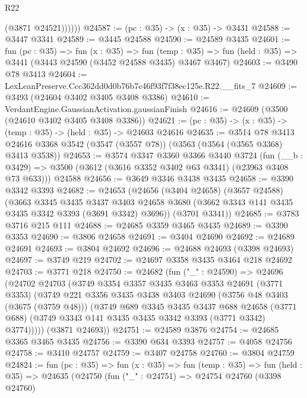 \begin{lexlean}{R22}
\begin{coremodule}
              (@3871 @24521))))))
@24587 := (pc : @35) -> (x : @35) -> @3431
@24588 := @3447 @3341
@24589 := @3445 @24588
@24590 := @24589 @3435
@24601 := fun (pc : @35) =>
  fun (x : @35) =>
  fun (temp : @35) => fun (held : @35) => @3441 (@3443 @24590 (@3452 @24588 @3435) @3467 @3467)
@24603 := @3490 @78 @3413
@24604 := LexLeanPreserve.Ccc362dd0d0b76b7c46f93f7f38ec125e.R22.__fits_7
@24609 := @3493 (@24604 @3402 @3405 @3408 @3386)
@24610 := VerdantEngine.GaussianActivation.gaussianFinish
@24616 := @24609 (@3500 (@24610 @3402 @3405 @3408 @3386))
@24621 := (pc : @35) -> (x : @35) -> (temp : @35) -> (held : @35) -> @24603 @24616
@24635 := @3514
    @78
    @3413
    @24616
    @3368
    @3542
    (@3547 (@3557 @78))
    (@3563 (@3564 (@3565 @3368) @3413 @3538))
@24653 := @3574
    @3347
    @3360
    @3366
    @3440
    @3724
    (fun (__b : @3429) => @3500 (@3612 (@3616 @3352 @3402 @63 @3341) (@23963 @3408 @73 @633)))
    @24588
@24656 := @3649 @3346 @3438 @3435
@24658 := @3390 @3342 @3393
@24682 := @24653
    (@24656
      (@3404 @24658)
      (@3657 @24588)
      (@3663
        @3345
        @3435
        @3437
        @3403
        @24658
        @3680
        (@3662 @3343 @141 @3435 @3435 @3342 @3393 (@3691 @3342) @3696))
      (@3701 @3341))
@24685 := @3783 @3716 @215 @111
@24688 := @24685 @3359 @3465 @3435
@24689 := @3390 @3353
@24690 := @3806 @24658
@24691 := @3404 @24690
@24692 := @24689 @24691
@24693 := @3804 @24692
@24696 := @24688 @24693 (@3398 @24693)
@24697 := @3749 @219
@24702 := @24697 @3358 @3435 @3464 @218 @24692
@24703 := @3771 @218
@24750 := @24682
    (fun ("_" : @24590) =>
    @24696
      (@24702
        @24703
        (@3749
          @3354
          @3357
          @3435
          @3463
          @3353
          @24691
          (@3771 @3353)
          (@3749
            @221
            @3356
            @3435
            @3438
            @3403
            @24690
            (@3756 @48 @3403 (@3675 (@3759 @48)))
            (@3749
              @689
              @3345
              @3435
              @3437
              @688
              @24658
              (@3771 @688)
              (@3749 @3343 @141 @3435 @3435 @3342 @3393 (@3771 @3342) @3774)))))
      (@3871 @24693))
@24751 := @24589 @3876
@24754 := @24685 @3365 @3465 @3435
@24756 := @3390 @634 @3393
@24757 := @4058 @24756
@24758 := @3410 @24757
@24759 := @3407 @24758
@24760 := @3804 @24759
@24824 := fun (pc : @35) =>
  fun (x : @35) =>
  fun (temp : @35) =>
  fun (held : @35) =>
  @24635
    (@24750
      (fun ("_" : @24751) =>
      @24754
        @24760
        (@3398 @24760)

\end{coremodule}
\end{lexlean}
